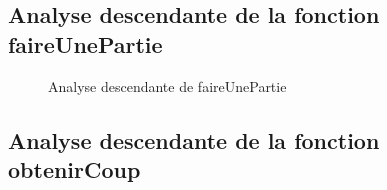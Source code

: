 \documentclass{article}
\begin{document}
\subsection{Analyse descendante de la fonction faireUnePartie}

\begin{figure}[H]
    \caption{Analyse descendante de faireUnePartie}
    \label{un-identifiant1}
\end{figure}

\subsection{Analyse descendante de la fonction obtenirCoup}
\end{document}
